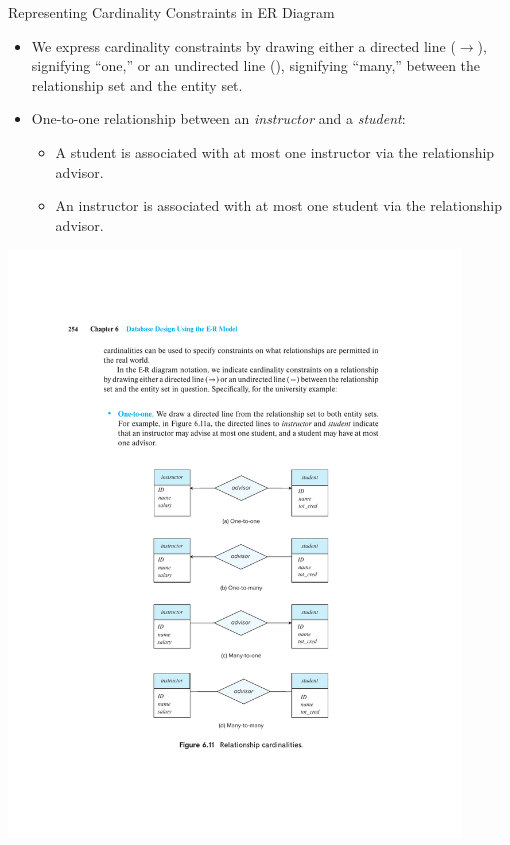 \documentclass{beamer}
\begin{document}
\begin{frame}{Representing Cardinality Constraints in ER Diagram}
    \begin{itemize}
        \item We express cardinality constraints by drawing either a directed line ($\rightarrow$), signifying ``one,'' or an undirected line (\textemdash), signifying ``many,'' between the relationship set and the entity set.
        \item One-to-one relationship between an \textit{instructor} and a \textit{student}:
        \begin{itemize}
            \item A student is associated with at most one instructor via the relationship advisor.
            \item An instructor is associated with at most one student via the relationship advisor.
        \end{itemize}
    \end{itemize}
    \centering
    \includegraphics[trim={6cm 15.20cm 6cm 10cm}, clip, width=0.9\textwidth]{figures/p254}
\end{frame}
\end{document}
